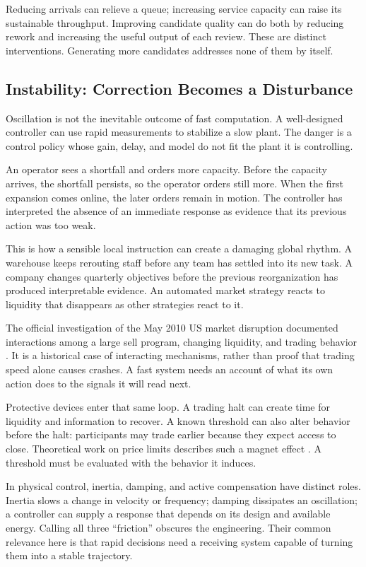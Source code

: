 \documentclass[11pt,openany]{book}
\begin{document}
Reducing arrivals can relieve a queue; increasing service capacity can raise its sustainable throughput. Improving candidate quality can do both by reducing rework and increasing the useful output of each review. These are distinct interventions. Generating more candidates addresses none of them by itself.

\subsection{Instability: Correction Becomes a Disturbance}

Oscillation is not the inevitable outcome of fast computation. A well-designed controller can use rapid measurements to stabilize a slow plant. The danger is a control policy whose gain, delay, and model do not fit the plant it is controlling.

An operator sees a shortfall and orders more capacity. Before the capacity arrives, the shortfall persists, so the operator orders still more. When the first expansion comes online, the later orders remain in motion. The controller has interpreted the absence of an immediate response as evidence that its previous action was too weak.

This is how a sensible local instruction can create a damaging global rhythm. A warehouse keeps rerouting staff before any team has settled into its new task. A company changes quarterly objectives before the previous reorganization has produced interpretable evidence. An automated market strategy reacts to liquidity that disappears as other strategies react to it.

The official investigation of the May 2010 US market disruption documented interactions among a large sell program, changing liquidity, and trading behavior \cite{sec2010findings}. It is a historical case of interacting mechanisms, rather than proof that trading speed alone causes crashes. A fast system needs an account of what its own action does to the signals it will read next.

Protective devices enter that same loop. A trading halt can create time for liquidity and information to recover. A known threshold can also alter behavior before the halt: participants may trade earlier because they expect access to close. Theoretical work on price limits describes such a magnet effect \cite{subrahmanyam1994}. A threshold must be evaluated with the behavior it induces.

In physical control, inertia, damping, and active compensation have distinct roles. Inertia slows a change in velocity or frequency; damping dissipates an oscillation; a controller can supply a response that depends on its design and available energy. Calling all three “friction” obscures the engineering. Their common relevance here is that rapid decisions need a receiving system capable of turning them into a stable trajectory.
\end{document}
